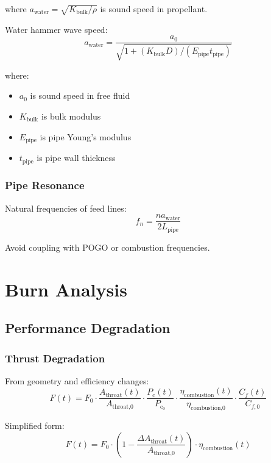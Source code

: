 \documentclass[12pt,a4paper]{article}
\newcommand{\Pc}{P_{\text{c}}}
\begin{document}
where $a_{\text{water}} = \sqrt{K_{\text{bulk}} / \rho}$ is sound speed in propellant.

Water hammer wave speed:
\begin{equation}
a_{\text{water}} = \frac{a_0}{\sqrt{1 + (K_{\text{bulk}} D)/(E_{\text{pipe}} t_{\text{pipe}})}}
\end{equation}

where:
\begin{itemize}
    \item $a_0$ is sound speed in free fluid
    \item $K_{\text{bulk}}$ is bulk modulus
    \item $E_{\text{pipe}}$ is pipe Young's modulus
    \item $t_{\text{pipe}}$ is pipe wall thickness
\end{itemize}

\subsubsection{Pipe Resonance}

Natural frequencies of feed lines:
\begin{equation}
f_n = \frac{n a_{\text{water}}}{2 L_{\text{pipe}}}
\end{equation}

Avoid coupling with POGO or combustion frequencies.

\section{Burn Analysis}

\subsection{Performance Degradation}

\subsubsection{Thrust Degradation}

From geometry and efficiency changes:
\begin{equation}
F(t) = F_0 \cdot \frac{A_{\text{throat}}(t)}{A_{\text{throat,0}}} \cdot \frac{\Pc(t)}{\Pc_0} \cdot \frac{\eta_{\text{combustion}}(t)}{\eta_{\text{combustion,0}}} \cdot \frac{C_f(t)}{C_{f,0}}
\end{equation}

Simplified form:
\begin{equation}
F(t) = F_0 \cdot \left(1 - \frac{\Delta A_{\text{throat}}(t)}{A_{\text{throat,0}}}\right) \cdot \eta_{\text{combustion}}(t)
\end{equation}
\end{document}
